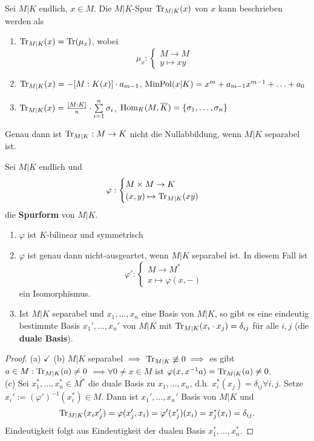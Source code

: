 \begin{erinnerungnr}
    Sei $M|K$ endlich, $x \in M$. Die $M|K$-Spur $\operatorname{Tr}_{M|K}(x)$ von $x$ kann beschrieben werden als
    \begin{enumerate}[label=(\arabic*)]
        \item $\operatorname{Tr}_{M|K}(x) = \operatorname{Tr}(\mu_x)$, wobei
        $$ \mu_x : \begin{cases}
            M \to M\\
            y \mapsto xy
        \end{cases}$$

        \item $\operatorname{Tr}_{M|K}(x) = - [M:K(x)] \cdot a_{m-1}$, $\operatorname{MinPol} (x|K) = x^m + a_{m-1}x^{m-1} + \ldots + a_0$
        \item $\operatorname{Tr}_{M|K}(x) = \frac{[M:K]}{n} \cdot \sum\limits_{i=1}^n \sigma_i$, $\operatorname{Hom}_K (M, \overline{K}) = \{\sigma_1, \ldots, \sigma_n\}$
    \end{enumerate}
    Genau dann ist $\operatorname{Tr}_{M|K}: M \to K$ nicht die Nullabbildung, wenn $M|K$ separabel ist.
\end{erinnerungnr}

\begin{lemma}
    Sei $M|K$ endlich und 
    $$ \varphi : \begin{cases}
        M \times M \to K\\
        (x,y) \mapsto \operatorname{Tr}_{M|K}(xy)
    \end{cases}$$
    die \textbf{Spurform} von $M|K$.
    \begin{enumerate}[label=(\alph*)]
        \item $\varphi$ ist $K$-bilinear und symmetrisch
        \item $\varphi$ ist genau dann nicht-ausgeartet, wenn $M|K$ separabel ist. In diesem Fall ist
        $$ \varphi': \begin{cases}
            M \to M^\ast\\
            x \mapsto \varphi(x,-)
        \end{cases}$$
        ein Isomorphismus.

        \item Ist $M|K$ separabel und $x_1,\ldots,x_n$ eine Basis von $M|K$, so gibt es eine eindeutig bestimmte Basis
        $x_1',\ldots,x_n'$ von $M|K$ mit $\operatorname{Tr}_{M|K}(x_i\cdot x_j) = \delta_{ij}$ für alle $i,j$ (die \textbf{duale Basis}).
    \end{enumerate}
\end{lemma}
\begin{proof}
    (a) $\checkmark$ (b) $M|K$ separabel $\implies$ $\operatorname{Tr}_{M|K} \not \equiv 0 \implies$ es gibt $a \in M: \operatorname{Tr}_{M|K}(a) \neq 0$
    $\implies \forall 0 \ne x \in M$ ist $\varphi(x, x^{-1}a) = \operatorname{Tr}_{M|K}(a) \ne 0$.\\
    (c) Sei $x_1^\ast, \ldots, x_n^\ast \in M^\ast$ die duale Basis zu $x_1,\ldots,x_n$, d.h. $x_i^\ast(x_j) = \delta_{ij} \forall i,j$.
    Setze $x_i' := (\varphi')^{-1}(x_i^\ast) \in M$. Dann ist $x_1',\ldots,x_n'$ Basis von $M|K$ und 
    $$ \operatorname{Tr}_{M|K}(x_i x_j') = \varphi(x_j',x_i) = \varphi'(x_j')(x_i) = x_j^\ast(x_i) = \delta_{ij}.$$
    Eindeutigkeit folgt aus Eindeutigkeit der dualen Basis $x_1^\ast,\ldots,x_n^\ast$.
\end{proof}

